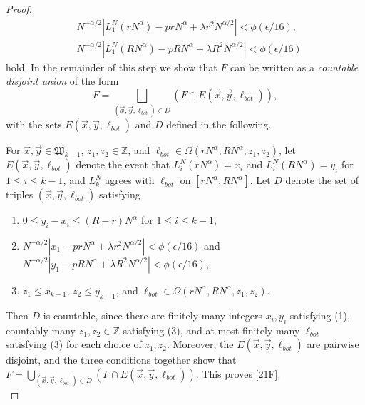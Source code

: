 \begin{proof}
\begin{equation}
		\begin{split}
		& N^{-\alpha/2}\left|L_1^N(rN^\alpha) - prN^\alpha + \lambda r^2N^{\alpha/2}\right| < \phi(\epsilon/16),\\
		& N^{-\alpha/2}\left|L_1^N(RN^\alpha) - pRN^\alpha + \lambda R^2N^{\alpha/2}\right| < \phi(\epsilon/16)
		\end{split}
		\end{equation}
		hold. In the remainder of this step we show that $F$ can be written as a \textit{countable disjoint union} of the form
		\begin{equation}\label{21F}
		F = \bigsqcup_{(\vec{x},\vec{y},\ell_{bot})\in D} \left( F \cap E(\vec{x},\vec{y},\ell_{bot})\right),
		\end{equation} 
		with the sets $E(\vec{x},\vec{y},\ell_{bot})$ and $D$
		defined in the following.
		
		For $\vec{x},\vec{y}\in\mathfrak{W}_{k-1}$, $z_1,z_2\in\mathbb{Z}$, and $\ell_{bot}\in\Omega(rN^\alpha,RN^\alpha,z_1,z_2)$, let $E(\vec{x},\vec{y},\ell_{bot})$ denote the event that $L_i^N(rN^\alpha) = x_i$ and $L_i^N(RN^\alpha)=y_i$ for $1\leq i\leq k-1$, and $L_k^N$ agrees with $\ell_{bot}$ on $[rN^\alpha,RN^\alpha]$. Let $D$ denote the set of triples $(\vec{x},\vec{y},\ell_{bot})$ satisfying
		\begin{enumerate}[label=(\arabic*)]
			
			\item $0\leq y_i - x_i \leq (R-r)N^\alpha$ for $1\leq i\leq k-1$,
			
			\item $N^{-\alpha/2}|x_1 - prN^\alpha + \lambda r^2N^{\alpha/2}| < \phi(\epsilon/16)$ and $N^{-\alpha/2}|y_1-pRN^\alpha + \lambda R^2N^{\alpha/2}| < \phi(\epsilon/16)$,
			
			\item $z_1\leq x_{k-1}$, $z_2\leq y_{k-1}$, and $\ell_{bot} \in \Omega(rN^\alpha,RN^\alpha,z_1,z_2)$.
			
		\end{enumerate}
		Then $D$ is countable, since there are finitely many integers $x_i,y_i$ satisfying (1), countably many $z_1,z_2\in\mathbb{Z}$ satisfying (3), and at most finitely many $\ell_{bot}$ satisfying (3) for each choice of $z_1,z_2$. Moreover, the $E(\vec{x},\vec{y},\ell_{bot})$ are pairwise disjoint, and the three conditions together show that $F = \bigcup_{(\vec{x},\vec{y},\ell_{bot})\in D} (F\cap E(\vec{x},\vec{y},\ell_{bot}))$. This proves \eqref{21F}.\\
		

\end{proof}
